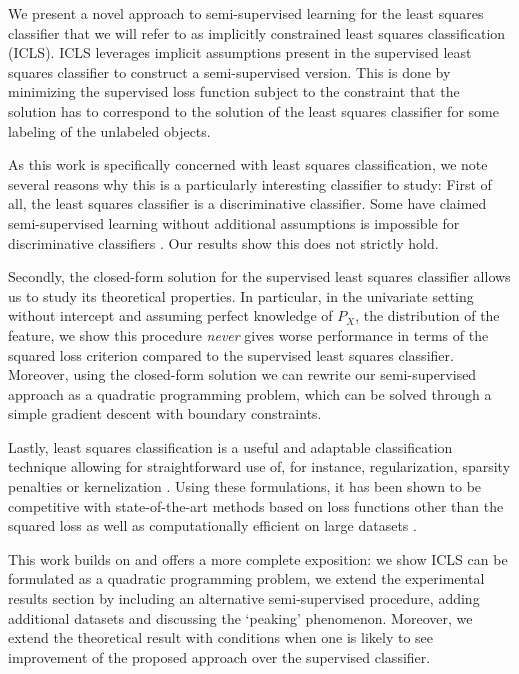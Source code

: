 \documentclass[twoside]{memoir}\usepackage[]{graphicx}\usepackage{xcolor}
\begin{document}
We present a novel approach to semi-supervised learning for the least squares classifier that we will refer to as implicitly constrained least squares classification (ICLS). ICLS leverages implicit assumptions present in the supervised least squares classifier to construct a semi-supervised version. This is done by minimizing the supervised loss function subject to the constraint that the solution has to correspond to the solution of the least squares classifier for some labeling of the unlabeled objects.

As this work is specifically concerned with least squares classification, we note several reasons why this is a particularly interesting classifier to study: 
First of all, the least squares classifier is a discriminative classifier. 
Some have claimed semi-supervised learning without additional assumptions is impossible for discriminative classifiers \citep{Seeger2001,Singh2008}. Our results show this does not strictly hold. 

Secondly, the closed-form solution for the supervised least squares classifier allows us to study its theoretical properties. In particular, in the univariate setting without intercept and assuming perfect knowledge of $P_X$, the distribution of the feature, we show this procedure \emph{never} gives worse performance in terms of the squared loss criterion compared to the supervised least squares classifier. Moreover, using the closed-form solution we can rewrite our semi-supervised approach as a quadratic programming problem, which can be solved through a simple gradient descent with boundary constraints.

Lastly, least squares classification is a useful and adaptable classification technique  allowing for straightforward use of, for instance, regularization, sparsity penalties or kernelization \citep{Hastie2009,Poggio2003,Rifkin2003,Suykens1999,Tibshirani1996}. 
Using these formulations, it has been shown to be competitive with state-of-the-art methods based on loss functions other than the squared loss \citep{Rifkin2003} as well as computationally efficient on large datasets \citep{Bottou2010}.

This work builds on \citep{Krijthe2015} and offers a more complete exposition: we show ICLS can be formulated  as a quadratic programming problem, we extend the experimental results section by including an alternative semi-supervised procedure, adding additional datasets and discussing the ‘peaking’ phenomenon. Moreover, we extend the theoretical result with conditions when one is likely to see improvement of the proposed approach over the supervised classifier.
\end{document}
